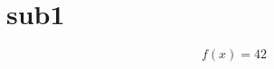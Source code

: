 \section{sub1}\label{sec:sub1}

\begin{equation}
  f(x) = 42
  \label{eq:sub-is-working}
\end{equation}
